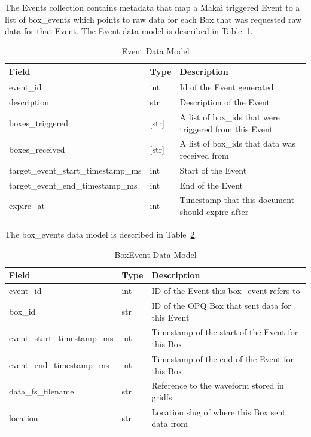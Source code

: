 The Events collection contains metadata that map a Makai triggered Event to a list of box\_events which points to raw data for each Box that was requested raw data for that Event. The Event data model is described in Table~\ref{table:Events}.

\begin{table}[H]
	\centering
	\caption{Event Data Model}
	\begin{tabularx}{\textwidth}{llX}
		\toprule
		\textbf{Field} & \textbf{Type} & \textbf{Description} \\
		\midrule
		event\_id & int & Id of the Event generated \\
		description & str & Description of the Event \\
		boxes\_triggered & [str] & A list of box\_ids that were triggered from this Event \\
		boxes\_received & [str] & A list of box\_ids that data was received from \\
		target\_event\_start\_timestamp\_ms & int & Start of the Event \\
		target\_event\_end\_timestamp\_ms & int & End of the Event \\
		expire\_at & int & Timestamp that this document should expire after \\
		\bottomrule
	\end{tabularx}
	\label{table:Events}
\end{table}

The box\_events data model is described in Table~\ref{table:BoxEvents}.

\begin{table}[H]
    \centering
    \caption{BoxEvent Data Model}
    \begin{tabularx}{\textwidth}{llX}
        \toprule
        \textbf{Field} & \textbf{Type} & \textbf{Description} \\
        \midrule
        event\_id & int & ID of the Event this box\_event refers to \\
        box\_id & str & ID of the OPQ Box that sent data for this Event \\
        event\_start\_timestamp\_ms & int & Timestamp of the start of the Event for this Box \\
        event\_end\_timestamp\_ms & int & Timestamp of the end of the Event for this Box \\
        data\_fs\_filename & str & Reference to the waveform stored in gridfs \\
        location & str & Location slug of where this Box sent data from \\
        \bottomrule
    \end{tabularx}
    \label{table:BoxEvents}
\end{table}

